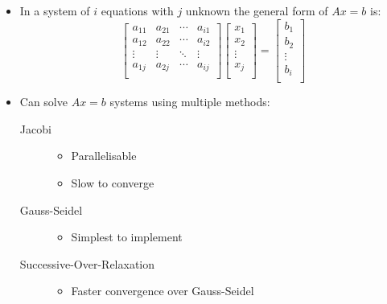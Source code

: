 \documentclass[a4paper]{article}
\begin{document}
\begin{itemize}
  \item
    In a system of $i$ equations with $j$ unknown the general form of $Ax = b$
    is:
    \[
      \left [
        \begin{array}{cccc}
          a_{11} & a_{21} & \cdots & a_{i1} \\
          a_{12} & a_{22} & \cdots & a_{i2} \\
          \vdots & \vdots & \ddots & \vdots \\
          a_{1j} & a_{2j} & \cdots & a_{ij} \\
        \end{array}
      \right ]
      \left [
        \begin{array}{c}
          x_{1}  \\
          x_{2}  \\
          \vdots \\
          x_{j}  \\
        \end{array}
      \right ]
      =
      \left [
        \begin{array}{c}
          b_{1}  \\
          b_{2}  \\
          \vdots \\
          b_{i}  \\
        \end{array}
      \right ]
    \]

  \item
    Can solve $Ax = b$ systems using multiple methods:
    \begin{description}
      \item[Jacobi] \hfill
        \begin{itemize}
          \item
            Parallelisable

          \item
            Slow to converge

        \end{itemize}

      \item[Gauss-Seidel] \hfill
        \begin{itemize}
          \item
            Simplest to implement

        \end{itemize}

      \item[Successive-Over-Relaxation] \hfill
        \begin{itemize}
          \item
            Faster convergence over Gauss-Seidel


\end{itemize}
\end{description}
\end{itemize}
\end{document}
